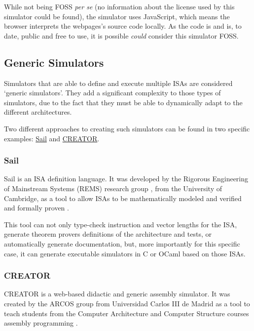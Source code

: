 While not being \gls{FOSS} \textit{per se} (no information about the license used by this simulator could be found), the simulator uses JavaScript, which means the browser interprets the webpages's source code locally. As the code is  and is, to date, public and free to use, it is possible \textit{could} consider this simulator \gls{FOSS}.





\subsection{Generic Simulators}\label{subsec:generic-assembly-simulators}
Simulators that are able to define and execute multiple \glspl{ISA} are considered `generic simulators'. They add a significant complexity to those types of simulators, due to the fact that they must be able to dynamically adapt to the different architectures.

Two different approaches to creating such simulators can be found in two specific examples: \hyperref[subsubsec:sail]{Sail} and \hyperref[subsubsec:creator]{CREATOR}.


\subsubsection*{Sail}\label{subsubsec:sail}
Sail \parencite{sail} is an \gls{ISA} definition language. It was developed by the Rigorous Engineering of Mainstream Systems (REMS) research group \parencite{rems}, from the University of Cambridge, as a tool to allow \glspl{ISA} to be mathematically modeled and verified and formally proven \parencite{ArmstrongAlasdair2019IsfA}.

This tool can not only type-check instruction and vector lengths for the \gls{ISA}, generate \glspl{theorem prover} definitions of the architecture and tests, or automatically generate documentation, but, more importantly for this specific case, it can generate executable simulators in C or OCaml based on those \glspl{ISA}.


\subsubsection*{CREATOR}\label{subsubsec:creator}
CREATOR \parencite{creator} is a web-based didactic and generic \gls{assembly} simulator. It was created by the ARCOS group from Universidad Carlos III de Madrid as a tool to teach students from the Computer Architecture and Computer Structure courses \gls{assembly} programming \parencite{creatorZenodo}.

